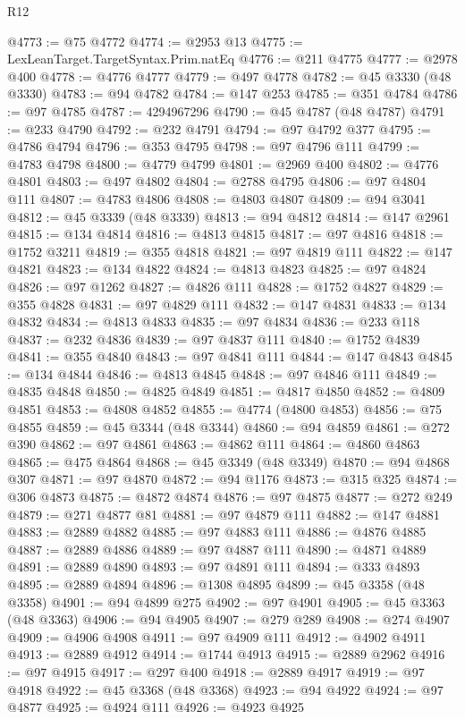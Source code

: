 \begin{lexlean}{R12}
\begin{coremodule}
{{{{{{{{{{{{{{{{{{{{{{{{{{{{{{{{{{{{{{{{{{{{{{{{{{{{{{{{{{{{{{{{{{{{{{{{{{{{{{{{{{@4773 := @75 @4772
@4774 := @2953 @13
@4775 := LexLeanTarget.TargetSyntax.Prim.natEq
@4776 := @211 @4775
@4777 := @2978 @400
@4778 := @4776 @4777
@4779 := @497 @4778
@4782 := @45 @3330 (@48 @3330)
@4783 := @94 @4782
@4784 := @147 @253
@4785 := @351 @4784
@4786 := @97 @4785
@4787 := 4294967296
@4790 := @45 @4787 (@48 @4787)
@4791 := @233 @4790
@4792 := @232 @4791
@4794 := @97 @4792 @377
@4795 := @4786 @4794
@4796 := @353 @4795
@4798 := @97 @4796 @111
@4799 := @4783 @4798
@4800 := @4779 @4799
@4801 := @2969 @400
@4802 := @4776 @4801
@4803 := @497 @4802
@4804 := @2788 @4795
@4806 := @97 @4804 @111
@4807 := @4783 @4806
@4808 := @4803 @4807
@4809 := @94 @3041
@4812 := @45 @3339 (@48 @3339)
@4813 := @94 @4812
@4814 := @147 @2961
@4815 := @134 @4814
@4816 := @4813 @4815
@4817 := @97 @4816
@4818 := @1752 @3211
@4819 := @355 @4818
@4821 := @97 @4819 @111
@4822 := @147 @4821
@4823 := @134 @4822
@4824 := @4813 @4823
@4825 := @97 @4824
@4826 := @97 @1262
@4827 := @4826 @111
@4828 := @1752 @4827
@4829 := @355 @4828
@4831 := @97 @4829 @111
@4832 := @147 @4831
@4833 := @134 @4832
@4834 := @4813 @4833
@4835 := @97 @4834
@4836 := @233 @118
@4837 := @232 @4836
@4839 := @97 @4837 @111
@4840 := @1752 @4839
@4841 := @355 @4840
@4843 := @97 @4841 @111
@4844 := @147 @4843
@4845 := @134 @4844
@4846 := @4813 @4845
@4848 := @97 @4846 @111
@4849 := @4835 @4848
@4850 := @4825 @4849
@4851 := @4817 @4850
@4852 := @4809 @4851
@4853 := @4808 @4852
@4855 := @4774 (@4800 @4853)
@4856 := @75 @4855
@4859 := @45 @3344 (@48 @3344)
@4860 := @94 @4859
@4861 := @272 @390
@4862 := @97 @4861
@4863 := @4862 @111
@4864 := @4860 @4863
@4865 := @475 @4864
@4868 := @45 @3349 (@48 @3349)
@4870 := @94 @4868 @307
@4871 := @97 @4870
@4872 := @94 @1176
@4873 := @315 @325
@4874 := @306 @4873
@4875 := @4872 @4874
@4876 := @97 @4875
@4877 := @272 @249
@4879 := @271 @4877 @81
@4881 := @97 @4879 @111
@4882 := @147 @4881
@4883 := @2889 @4882
@4885 := @97 @4883 @111
@4886 := @4876 @4885
@4887 := @2889 @4886
@4889 := @97 @4887 @111
@4890 := @4871 @4889
@4891 := @2889 @4890
@4893 := @97 @4891 @111
@4894 := @333 @4893
@4895 := @2889 @4894
@4896 := @1308 @4895
@4899 := @45 @3358 (@48 @3358)
@4901 := @94 @4899 @275
@4902 := @97 @4901
@4905 := @45 @3363 (@48 @3363)
@4906 := @94 @4905
@4907 := @279 @289
@4908 := @274 @4907
@4909 := @4906 @4908
@4911 := @97 @4909 @111
@4912 := @4902 @4911
@4913 := @2889 @4912
@4914 := @1744 @4913
@4915 := @2889 @2962
@4916 := @97 @4915
@4917 := @297 @400
@4918 := @2889 @4917
@4919 := @97 @4918
@4922 := @45 @3368 (@48 @3368)
@4923 := @94 @4922
@4924 := @97 @4877
@4925 := @4924 @111
@4926 := @4923 @4925
}}}}}}}}}}}}}}}}}}}}}}}}}}}}}}}}}}}}}}}}}}}}}}}}}}}}}}}}}}}}}}}}}}}}}}}}}}}}}}}}}}
\end{coremodule}
\end{lexlean}
